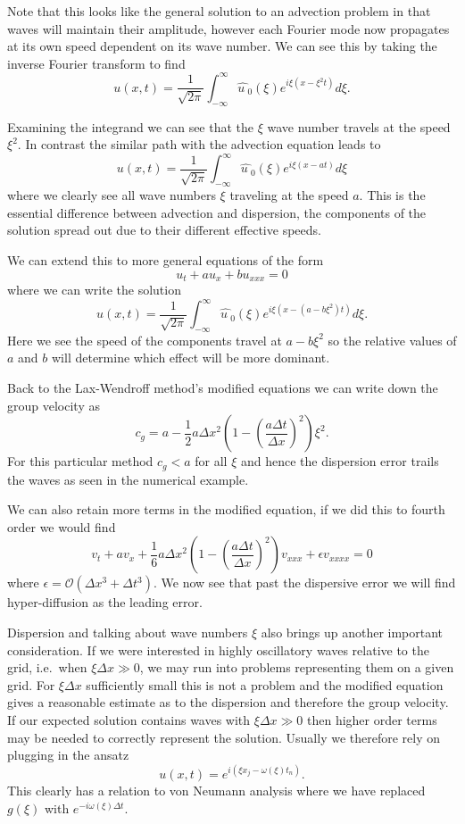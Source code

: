 \documentclass[11pt]{article}
\begin{document}
    Note that this looks like the general solution to an advection problem
in that waves will maintain their amplitude, however each Fourier mode
now propagates at its own speed dependent on its wave number. We can see
this by taking the inverse Fourier transform to find \[
    u(x,t) = \frac{1}{\sqrt{2 \pi}} \int^\infty_{-\infty} \hat{u~}_0(\xi) e^{i\xi(x - \xi^2 t)} d\xi.
\]

    Examining the integrand we can see that the \(\xi\) wave number travels
at the speed \(\xi^2\). In contrast the similar path with the advection
equation leads to \[
    u(x,t) = \frac{1}{\sqrt{2 \pi}} \int^\infty_{-\infty} \hat{u~}_0(\xi) e^{i\xi(x - a t)} d\xi
\] where we clearly see all wave numbers \(\xi\) traveling at the speed
\(a\). This is the essential difference between advection and
dispersion, the components of the solution spread out due to their
different effective speeds.

    We can extend this to more general equations of the form \[
    u_t + a u_x + b u_{xxx} = 0
\] where we can write the solution \[
    u(x,t) = \frac{1}{\sqrt{2 \pi}} \int^\infty_{-\infty} \hat{u~}_0(\xi) e^{i \xi (x - (a - b\xi^2) t)} d\xi.
\] Here we see the speed of the components travel at \(a - b \xi^2\) so
the relative values of \(a\) and \(b\) will determine which effect will
be more dominant.

    Back to the Lax-Wendroff method's modified equations we can write down
the group velocity as \[
    c_g = a - \frac{1}{2} a \Delta x^2 \left(1 - \left( \frac{a \Delta t}{\Delta x} \right )^2 \right) \xi^2.
\] For this particular method \(c_g < a\) for all \(\xi\) and hence the
dispersion error trails the waves as seen in the numerical example.

    We can also retain more terms in the modified equation, if we did this
to fourth order we would find \[
    v_t + a v_x + \frac{1}{6} a \Delta x^2 \left(1 - \left( \frac{a \Delta t}{\Delta x} \right )^2 \right) v_{xxx} + \epsilon v_{xxxx} = 0
\] where \(\epsilon = \mathcal{O}(\Delta x^3 + \Delta t^3)\). We now see
that past the dispersive error we will find hyper-diffusion as the
leading error.

    Dispersion and talking about wave numbers \(\xi\) also brings up another
important consideration. If we were interested in highly oscillatory
waves relative to the grid, i.e.~when \(\xi \Delta x \gg 0\), we may run
into problems representing them on a given grid. For \(\xi \Delta x\)
sufficiently small this is not a problem and the modified equation gives
a reasonable estimate as to the dispersion and therefore the group
velocity. If our expected solution contains waves with
\(\xi \Delta x \gg 0\) then higher order terms may be needed to
correctly represent the solution. Usually we therefore rely on plugging
in the ansatz \[
    u(x,t) = e^{i(\xi x_j - \omega(\xi) t_n)}.
\] This clearly has a relation to von Neumann analysis where we have
replaced \(g(\xi)\) with \(e^{-i \omega(\xi) \Delta t}\).
\end{document}
